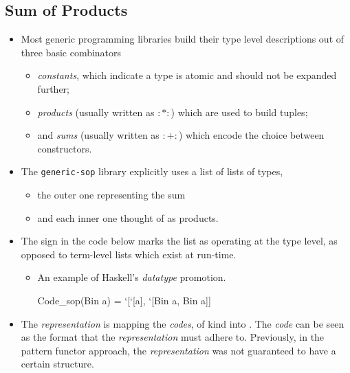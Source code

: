 \subsection{Sum of Products}
\begin{itemize}
    \item Most generic programming libraries build their type level descriptions out of three basic combinators
    \begin{itemize}
        \item \textit{constants}, which indicate a type is atomic and should not be expanded further;
        \item \textit{products} (usually written as $:*:$) which are used to build tuples;
        \item and \textit{sums} (usually written as $:+:$) which encode the choice between constructors.
    \end{itemize}
    \item The \texttt{generic-sop} library explicitly uses a list of lists of types,
    \begin{itemize}
        \item the outer one representing the sum
        \item and each inner one thought of as products.
    \end{itemize}
    \item The  sign in the code below marks the list as operating at the type level, as opposed to term-level lists which exist at run-time.
    \begin{itemize}
        \item An example of Haskell's \textit{datatype} promotion.
        \begin{haskell}
            Code_sop(Bin a) = `[`[a], `[Bin a, Bin a]]
        \end{haskell}
    \end{itemize}
    \item The \textit{representation} is mapping the \textit{codes}, of kind  into \inlinehaskell{*}. The \textit{code} can be seen as the format that the \textit{representation} must adhere to. Previously, in the pattern functor approach, the \textit{representation} was not guaranteed to have a certain structure.
\end{itemize}

